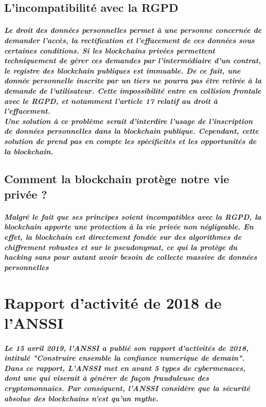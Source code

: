 \documentclass[12pt, a4paper, oneside]{book}
\begin{document}
    \section{L'incompatibilité avec la RGPD}
    \paragraph{Le droit des données personnelles permet 
    à une personne concernée de demander l’accès, la rectification 
    et l’effacement de ces données sous certaines conditions. 
    Si les blockchains privées permettent techniquement de gérer
    ces demandes par l’intermédiaire d’un contrat,
    le registre des blockchain publiques est immuable. De ce fait,
    une donnée personnelle inscrite par un tiers ne pourra pas être retirée 
    à la demande de l’utilisateur. Cette impossibilité entre en collision frontale avec le RGPD, 
    et notamment l’article 17 relatif au droit à l’effacement. 
    \\ 
    \newline
    Une solution à ce problème serait d'interdire l'usage de l'inscription de données personnelles dans la blockchain publique. 
    Cependant, cette solution de prend pas en compte les spécificités et les opportunités de la blockchain.
    }

    \section{Comment la blockchain protège notre vie privée ?}

    \paragraph{Malgré le fait que ses principes 
     soient incompatibles avec la RGPD, la blockchain apporte une protection à la vie privée non négligeable. 
     En effet, la blockchain est directement fondée sur des algorithmes de chiffrement robustes et sur le pseudonymat,
     ce qui la protège du hacking sans pour autant avoir besoin de collecte massive de données personnelles
     \cite{reg}}

    \chapter{Rapport d'activité de 2018 de l'ANSSI}

    \paragraph{Le 15 avril 2019, l'ANSSI a publié son rapport d'activités de 2018, intitulé \it{"Construire ensemble la confiance numerique de demain"}. 
    Dans ce rapport, L'ANSSI met en avant 5 types de cybermenaces, dont une qui viserait à générer de façon frauduleuse des cryptomonnaies. Par conséquent, l'ANSSI considère que la sécurité absolue des blockchains n'est qu'un mythe.
    \cite{anssi2018}}
\end{document}
